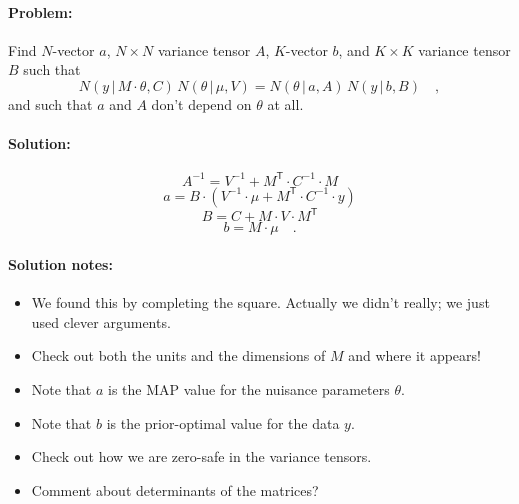 \documentclass[12pt, letterpaper]{article}
\newcommand{\given}{\,|\,}
\newcommand{\T}{^{\!\mathsf{T}}}
\newcommand{\inv}{^{-1}}
\begin{document}
\paragraph{Problem:}
Find $N$-vector $a$, $N\times N$ variance tensor $A$, $K$-vector $b$,
and $K\times K$ variance tensor $B$ such that
\begin{equation}
N(y\given M\cdot\theta, C)\,N(\theta\given\mu, V)
 = N(\theta\given a, A)\,N(y\given b, B) \quad ,
\end{equation}
and such that $a$ and $A$ don't depend on $\theta$ at all.

\paragraph{Solution:}
\begin{equation}
A\inv = V\inv + M\T \cdot C\inv \cdot M
\end{equation}
\begin{equation}
a = B \cdot (V\inv \cdot \mu + M\T \cdot C\inv \cdot y)
\end{equation}
\begin{equation}
B = C + M \cdot V \cdot M\T
\end{equation}
\begin{equation}
b = M \cdot \mu
\quad .
\end{equation}

\paragraph{Solution notes:}
\begin{itemize}
\item
We found this by completing the square. Actually we didn't really; we just
used clever arguments.
\item
Check out both the units and the dimensions of $M$ and where it appears!
\item
Note that $a$ is the MAP value for the nuisance parameters $\theta$.
\item
Note that $b$ is the prior-optimal value for the data $y$.
\item
Check out how we are zero-safe in the variance tensors.
\item
Comment about determinants of the matrices?
\end{itemize}
\end{document}
